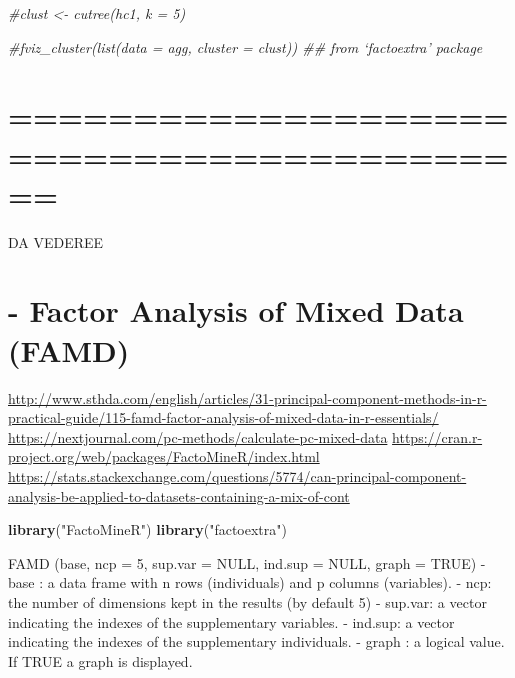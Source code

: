 \documentclass[
]{article}
\newenvironment{Shaded}{\begin{snugshade}}{\end{snugshade}}
\newcommand{\CommentTok}[1]{\textcolor[rgb]{0.56,0.35,0.01}{\textit{#1}}}
\newcommand{\DataTypeTok}[1]{\textcolor[rgb]{0.13,0.29,0.53}{#1}}
\newcommand{\DecValTok}[1]{\textcolor[rgb]{0.00,0.00,0.81}{#1}}
\newcommand{\KeywordTok}[1]{\textcolor[rgb]{0.13,0.29,0.53}{\textbf{#1}}}
\newcommand{\NormalTok}[1]{#1}
\newcommand{\OperatorTok}[1]{\textcolor[rgb]{0.81,0.36,0.00}{\textbf{#1}}}
\newcommand{\StringTok}[1]{\textcolor[rgb]{0.31,0.60,0.02}{#1}}
\begin{document}
\begin{Shaded}
\begin{Highlighting}[]
\CommentTok{#clust <- cutree(hc1, k = 5)}

\CommentTok{#fviz_cluster(list(data = agg, cluster = clust))  ## from ‘factoextra’ package }
\end{Highlighting}
\end{Shaded}

\hypertarget{section}{%
\section{==========================================}\label{section}}

DA VEDEREE

\hypertarget{factor-analysis-of-mixed-data-famd}{%
\section{- Factor Analysis of Mixed Data
(FAMD)}\label{factor-analysis-of-mixed-data-famd}}

\url{http://www.sthda.com/english/articles/31-principal-component-methods-in-r-practical-guide/115-famd-factor-analysis-of-mixed-data-in-r-essentials/}
\url{https://nextjournal.com/pc-methods/calculate-pc-mixed-data}
\url{https://cran.r-project.org/web/packages/FactoMineR/index.html}
\url{https://stats.stackexchange.com/questions/5774/can-principal-component-analysis-be-applied-to-datasets-containing-a-mix-of-cont}

\begin{Shaded}
\begin{Highlighting}[]
\KeywordTok{library}\NormalTok{(}\StringTok{"FactoMineR"}\NormalTok{)}
\KeywordTok{library}\NormalTok{(}\StringTok{"factoextra"}\NormalTok{)}
\end{Highlighting}
\end{Shaded}

FAMD (base, ncp = 5, sup.var = NULL, ind.sup = NULL, graph = TRUE) -
base : a data frame with n rows (individuals) and p columns (variables).
- ncp: the number of dimensions kept in the results (by default 5) -
sup.var: a vector indicating the indexes of the supplementary variables.
- ind.sup: a vector indicating the indexes of the supplementary
individuals. - graph : a logical value. If TRUE a graph is displayed.

\begin{Shaded}
\end{Shaded}
\end{document}
